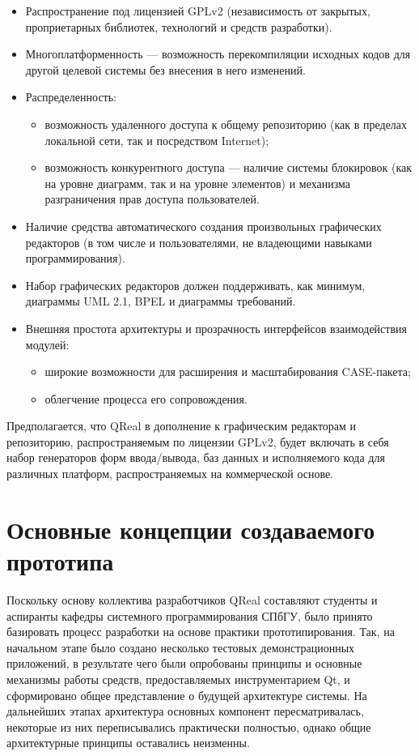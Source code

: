 \documentclass[a5paper]{article}
\begin{document}
\begin{itemize}
  \item Распространение под лицензией GPLv2
        (независимость от закрытых, проприетарных библиотек, технологий и
        средств разработки).
  \item Многоплатформенность --- возможность перекомпиляции исходных кодов для
        другой целевой системы без внесения в него изменений.
  \item Распределенность:
  \begin{itemize}
        \item
          возможность удаленного доступа к общему репозиторию (как в пределах
          локальной сети, так и посредством Internet);
        \item возможность конкурентного доступа --- наличие системы блокировок (как на
              уровне диаграмм, так и на уровне элементов) и механизма разграничения
              прав доступа пользователей.
  \end{itemize}
  \item Наличие средства автоматического создания произвольных графических
        редакторов (в том числе и пользователями, не владеющими навыками
        программирования).
  \item Набор графических редакторов должен поддерживать, как
        минимум, диаграммы UML 2.1, BPEL и диаграммы требований.
  \item Внешняя простота архитектуры и прозрачность интерфейсов взаимодействия
        модулей:
  \begin{itemize}
        \item широкие возможности для расширения и масштабирования
          CASE-пакета;
        \item облегчение процесса его сопровождения.
  \end{itemize}
\end{itemize}

Предполагается, что QReal в дополнение к
графическим редакторам и репозиторию, распространяемым по лицензии
GPLv2, будет включать в себя набор
генераторов форм ввода/вывода, баз данных и исполняемого кода для
различных платформ, распространяемых на коммерческой основе.

\section{Основные концепции создаваемого прототипа}

Поскольку основу коллектива разработчиков QReal составляют студенты и аспиранты
кафедры системного программирования СПбГУ, было принято базировать
процесс разработки на основе практики прототипирования. Так, на
начальном этапе было создано несколько тестовых демонстрационных
приложений, в результате чего были опробованы принципы и основные
механизмы работы средств, предоставляемых инструментарием Qt, и
сформировано общее представление о будущей архитектуре системы. На
дальнейших этапах архитектура основных компонент пересматривалась,
некоторые из них переписывались практически полностью, однако общие
архитектурные принципы оставались неизменны.
\end{document}
